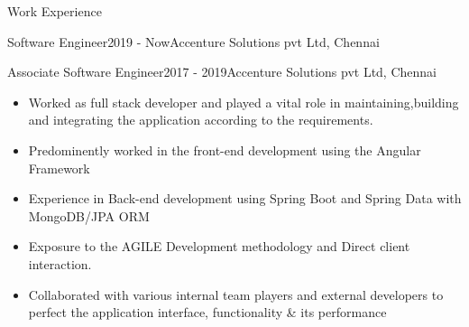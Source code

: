 \documentclass{resume} %
\begin{document}

\begin{rSection}{Work Experience}

\begin{rSubsection}{Software Engineer}{2019 - Now}{Accenture Solutions pvt Ltd, Chennai}{}
\end{rSubsection}
\begin{rSubsection}{Associate Software Engineer}{2017 - 2019}{Accenture Solutions pvt Ltd, Chennai}{}
\end{rSubsection}
\begin{itemize}
    \item Worked as full stack developer and played a vital role in maintaining,building and integrating the application according to the requirements.
    \item Predominently worked in the front-end development using the Angular Framework
    \item Experience in Back-end development using Spring Boot and Spring Data with MongoDB/JPA ORM
    \item Exposure to the AGILE Development methodology and Direct client interaction.
    \item Collaborated with various internal team players and external developers to perfect the application interface, functionality \& its performance
\end{itemize}

\end{rSection}
\end{document}
